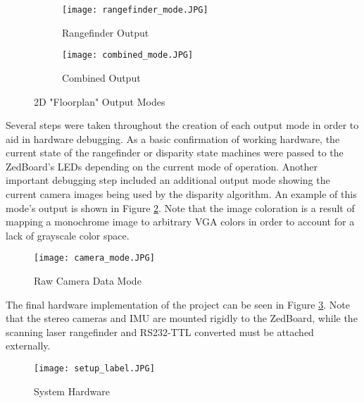 \begin{figure}[H] 
         \begin{subfigure}[h]{0.5\textwidth}
              \centerline{\texttt{[image: rangefinder\_mode.JPG]}}
             \caption{Rangefinder Output}
         \end{subfigure}
         \begin{subfigure}[h]{0.5\textwidth}
             \centerline{\texttt{[image: combined\_mode.JPG]}}
             \caption{Combined Output}
         \end{subfigure}
\caption{2D "Floorplan" Output Modes}
\label{rangeOutputs}
\end{figure}
\par 
Several steps were taken throughout the creation of each output mode in order to aid in hardware debugging. As a basic confirmation of working hardware, the current state of the rangefinder or disparity state machines were passed to the ZedBoard's LEDs depending on the current mode of operation. Another important debugging step included an additional output mode showing the current camera images being used by the disparity algorithm. An example of this mode's output is shown in Figure \ref{camOutMode}. Note that the image coloration is a result of mapping a monochrome image to arbitrary VGA colors in order to account for a lack of grayscale color space. 
\begin{figure}[H]  
 	\centerline{
	\texttt{[image: camera\_mode.JPG]}
	}
	\caption{Raw Camera Data Mode}
	\label{camOutMode}
\end{figure} 

The final hardware implementation of the project can be seen in Figure \ref{finalHW}. Note that the stereo cameras and IMU are mounted rigidly to the ZedBoard, while the scanning laser rangefinder and RS232-TTL converted must be attached externally. 

\par\null\par
\begin{figure}[H]  
 	\centerline{
	\texttt{[image: setup\_label.JPG]}
	}
	\caption{System Hardware}
	\label{finalHW}
\end{figure}
